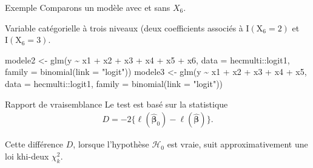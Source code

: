 \documentclass[
  ignorenonframetext,
]{beamer}
\newenvironment{Shaded}{\begin{snugshade}}{\end{snugshade}}
\newcommand{\AttributeTok}[1]{\textcolor[rgb]{0.40,0.45,0.13}{#1}}
\newcommand{\FunctionTok}[1]{\textcolor[rgb]{0.28,0.35,0.67}{#1}}
\newcommand{\NormalTok}[1]{\textcolor[rgb]{0.00,0.23,0.31}{#1}}
\newcommand{\OtherTok}[1]{\textcolor[rgb]{0.00,0.23,0.31}{#1}}
\newcommand{\SpecialCharTok}[1]{\textcolor[rgb]{0.37,0.37,0.37}{#1}}
\newcommand{\StringTok}[1]{\textcolor[rgb]{0.13,0.47,0.30}{#1}}
\begin{document}
\begin{frame}[fragile]{Exemple}
\protect\hypertarget{exemple}{}
Comparons un modèle avec et sans \(X_6\).

Variable catégorielle à trois niveaux (deux coefficients associés à
\(\mathrm{I}(\mathrm{X}_{6}=2)\) et \(\mathrm{I}(\mathrm{X}_{6}=3)\).

\begin{Shaded}
\begin{Highlighting}[numbers=left,,]
\NormalTok{modele2 }\OtherTok{\textless{}{-}}  \FunctionTok{glm}\NormalTok{(y }\SpecialCharTok{\textasciitilde{}}\NormalTok{ x1 }\SpecialCharTok{+}\NormalTok{ x2 }\SpecialCharTok{+}\NormalTok{ x3 }\SpecialCharTok{+}\NormalTok{ x4 }\SpecialCharTok{+}\NormalTok{ x5 }\SpecialCharTok{+}\NormalTok{ x6,}
                 \AttributeTok{data =}\NormalTok{ hecmulti}\SpecialCharTok{::}\NormalTok{logit1,}
                 \AttributeTok{family =} \FunctionTok{binomial}\NormalTok{(}\AttributeTok{link =} \StringTok{"logit"}\NormalTok{))}
\NormalTok{modele3 }\OtherTok{\textless{}{-}}  \FunctionTok{glm}\NormalTok{(y }\SpecialCharTok{\textasciitilde{}}\NormalTok{ x1 }\SpecialCharTok{+}\NormalTok{ x2 }\SpecialCharTok{+}\NormalTok{ x3 }\SpecialCharTok{+}\NormalTok{ x4 }\SpecialCharTok{+}\NormalTok{ x5,}
                 \AttributeTok{data =}\NormalTok{ hecmulti}\SpecialCharTok{::}\NormalTok{logit1,}
                 \AttributeTok{family =} \FunctionTok{binomial}\NormalTok{(}\AttributeTok{link =} \StringTok{"logit"}\NormalTok{)) }
\end{Highlighting}
\end{Shaded}
\end{frame}

\begin{frame}{Rapport de vraisemblance}
\protect\hypertarget{rapport-de-vraisemblance}{}
Le test est basé sur la statistique \begin{align*}
 D = -2\{\ell(\widehat{\boldsymbol{\beta}}_0)-\ell(\widehat{\boldsymbol{\beta}})\}.
\end{align*}

Cette différence \(D\), lorsque l'hypothèse \(\mathscr{H}_0\) est vraie,
suit approximativement une loi khi-deux \(\chi^2_k\).
\end{frame}
\end{document}
